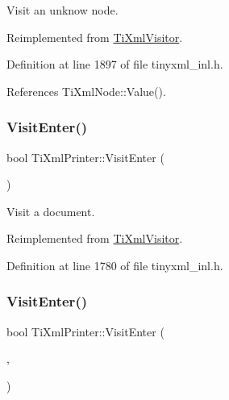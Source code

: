 Visit an unknow node. 



Reimplemented from \hyperlink{class_ti_xml_visitor_a7e284d607d275c51dac1adb58159ce28}{Ti\+Xml\+Visitor}.



Definition at line 1897 of file tinyxml\+\_\+inl.\+h.



References Ti\+Xml\+Node\+::\+Value().

\hypertarget{class_ti_xml_printer_a2ec73087db26ff4d2c4316c56f861db7}{}\label{class_ti_xml_printer_a2ec73087db26ff4d2c4316c56f861db7} 
\subsubsection{\texorpdfstring{Visit\+Enter()}{VisitEnter()}\hspace{0.1cm}{\footnotesize\ttfamily [1/2]}}
{\footnotesize\ttfamily bool Ti\+Xml\+Printer\+::\+Visit\+Enter (\begin{DoxyParamCaption}\item[{const \hyperlink{class_ti_xml_document}{Ti\+Xml\+Document} \&}]{ }\end{DoxyParamCaption})\hspace{0.3cm}{\ttfamily [virtual]}}



Visit a document. 



Reimplemented from \hyperlink{class_ti_xml_visitor_a07baecb52dd7d8716ae2a48ad0956ee0}{Ti\+Xml\+Visitor}.



Definition at line 1780 of file tinyxml\+\_\+inl.\+h.

\hypertarget{class_ti_xml_printer_a6dccaf5ee4979f13877690afe28721e8}{}\label{class_ti_xml_printer_a6dccaf5ee4979f13877690afe28721e8} 
\subsubsection{\texorpdfstring{Visit\+Enter()}{VisitEnter()}\hspace{0.1cm}{\footnotesize\ttfamily [2/2]}}
{\footnotesize\ttfamily bool Ti\+Xml\+Printer\+::\+Visit\+Enter (\begin{DoxyParamCaption}\item[{const \hyperlink{class_ti_xml_element}{Ti\+Xml\+Element} \&}]{,  }\item[{const \hyperlink{class_ti_xml_attribute}{Ti\+Xml\+Attribute} $\ast$}]{ }\end{DoxyParamCaption})\hspace{0.3cm}{\ttfamily [virtual]}}



